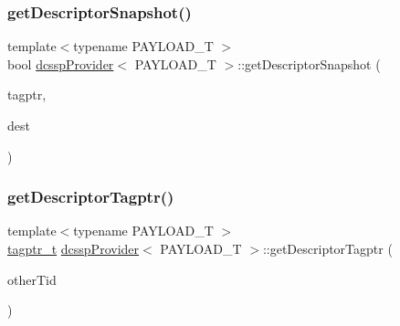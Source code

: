 \mbox{\label{classdcsspProvider_af0d2e30cfa0cd93a7ee7b0566c8f8c79}} 
\subsubsection{\texorpdfstring{get\+Descriptor\+Snapshot()}{getDescriptorSnapshot()}}
{\footnotesize\ttfamily template$<$typename P\+A\+Y\+L\+O\+A\+D\+\_\+T $>$ \\
bool \hyperlink{classdcsspProvider}{dcssp\+Provider}$<$ P\+A\+Y\+L\+O\+A\+D\+\_\+T $>$\+::get\+Descriptor\+Snapshot (\begin{DoxyParamCaption}\item[{\hyperlink{descriptors_8h_afd8a7b57046ed96897cda907f17737a7}{tagptr\+\_\+t}}]{tagptr,  }\item[{\hyperlink{dcss__plus_8h_ad9478df19b8b267f41952068562989c0}{dcsspptr\+\_\+t} const}]{dest }\end{DoxyParamCaption})\hspace{0.3cm}{\ttfamily [inline]}}

\mbox{\label{classdcsspProvider_ae7a68531e2f3ab76bc0b9a43cc5d4d8a}} 
\subsubsection{\texorpdfstring{get\+Descriptor\+Tagptr()}{getDescriptorTagptr()}}
{\footnotesize\ttfamily template$<$typename P\+A\+Y\+L\+O\+A\+D\+\_\+T $>$ \\
\hyperlink{descriptors_8h_afd8a7b57046ed96897cda907f17737a7}{tagptr\+\_\+t} \hyperlink{classdcsspProvider}{dcssp\+Provider}$<$ P\+A\+Y\+L\+O\+A\+D\+\_\+T $>$\+::get\+Descriptor\+Tagptr (\begin{DoxyParamCaption}\item[{const int}]{other\+Tid }\end{DoxyParamCaption})\hspace{0.3cm}{\ttfamily [inline]}}

\mbox{\label{classdcsspProvider_a61cf233d6fa18ba060af91a053ad87a6}} 
